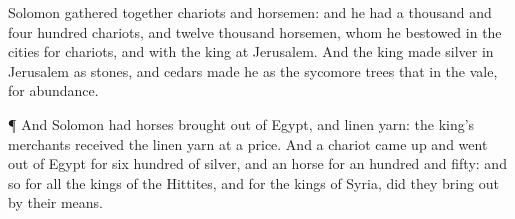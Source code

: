 {Solomon gathered
together
chariots and
horsemen: and he had a
thousand and
four
hundred
chariots, and
twelve
thousand
horsemen, whom he
bestowed in the
cities for
chariots, and with the
king at
Jerusalem.
And the
king
made
silver
{} in
Jerusalem as
stones, and
cedars
made he
{} as the sycomore
trees that
{} in the
vale, for
abundance.
\par }{\PP {}¶ And
Solomon had
horses
brought out of
Egypt, and linen
yarn: the
king’s
merchants
received the linen
yarn at a
price.
And a
chariot came
up and went
out of
Egypt for
six
hundred
{} of
silver, and an
horse for an
hundred and
fifty: and so for all the
kings of the
Hittites, and for the
kings of
Syria, did they bring
{}
out by their
means.

}
